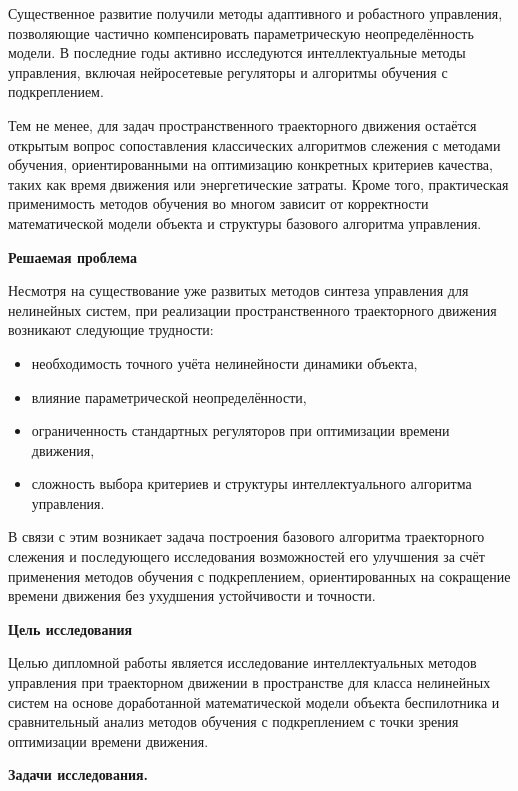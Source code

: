 Существенное развитие получили методы адаптивного и робастного управления, позволяющие частично компенсировать параметрическую неопределённость модели.
В последние годы активно исследуются интеллектуальные методы управления, включая нейросетевые регуляторы и алгоритмы обучения с подкреплением.

Тем не менее, для задач пространственного траекторного движения остаётся открытым вопрос сопоставления классических алгоритмов слежения с методами обучения, ориентированными на оптимизацию конкретных критериев качества, таких как время движения или энергетические затраты.
Кроме того, практическая применимость методов обучения во многом зависит от корректности математической модели объекта и структуры базового алгоритма управления.

\textbf{Решаемая проблема}

Несмотря на существование уже развитых методов синтеза управления для нелинейных систем, при реализации пространственного траекторного движения возникают следующие трудности:
\begin{itemize}
    \item необходимость точного учёта нелинейности динамики объекта,
    \item влияние параметрической неопределённости,
    \item ограниченность стандартных регуляторов при оптимизации времени движения,
    \item сложность выбора критериев и структуры интеллектуального алгоритма управления.
\end{itemize}
В связи с этим возникает задача построения базового алгоритма траекторного слежения и последующего исследования возможностей его улучшения за счёт применения методов обучения с подкреплением, ориентированных на сокращение времени движения без ухудшения устойчивости и точности.


\textbf{Цель исследования}

Целью дипломной работы является исследование интеллектуальных методов управления при траекторном движении в пространстве для класса нелинейных систем
на основе доработанной математической модели объекта беспилотника и сравнительный анализ методов обучения с подкреплением с точки зрения оптимизации времени движения.

\textbf{Задачи исследования.}

